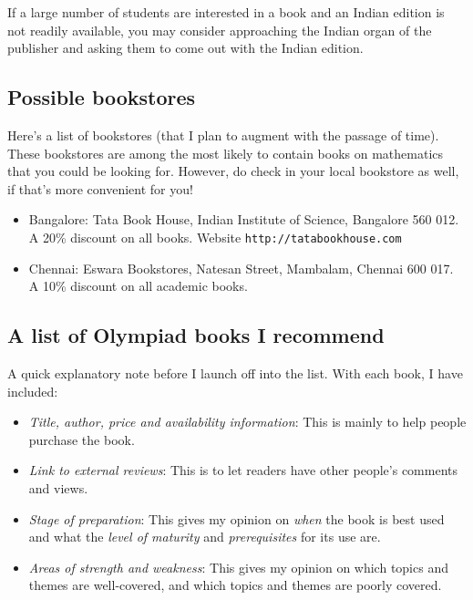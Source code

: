 \documentclass[a4paper]{amsart}
\begin{document}
If a large number of students are interested in a book and an Indian edition is not readily available, you may consider approaching the
Indian organ of the publisher and asking them to come out with the Indian edition.

\subsection{Possible bookstores}

Here's a list of bookstores (that I plan to augment with the passage of time). These bookstores are among the most likely
to contain books on mathematics that you could be looking for. However, do check in your local bookstore as well, if that's more
convenient for you!

\begin{itemize}

\item Bangalore: Tata Book House, Indian Institute of Science, Bangalore 560 012. 
  A 20\% discount on all books.
  Website {\tt http://tatabookhouse.com}

\item Chennai: Eswara Bookstores, Natesan Street, Mambalam, Chennai 600 017.
  A 10\% discount on all academic books.
\end{itemize}

\subsection{A list of Olympiad books I recommend}

A quick explanatory note before I launch off into the list. With each book, I have included:

\begin{itemize}

\item {\em Title, author, price and availability information}: This is mainly to help people purchase the book.
\item {\em Link to external reviews}: This is to let readers have other people's comments and views.
\item {\em Stage of preparation}: This gives my opinion on {\em when} the book is best used and what the
  {\em level of maturity} and {\em prerequisites} for its use are.
\item {\em Areas of strength and weakness}: This gives my opinion on which topics and themes
  are well-covered, and which topics and themes are poorly covered.
\end{itemize}
\end{document}
